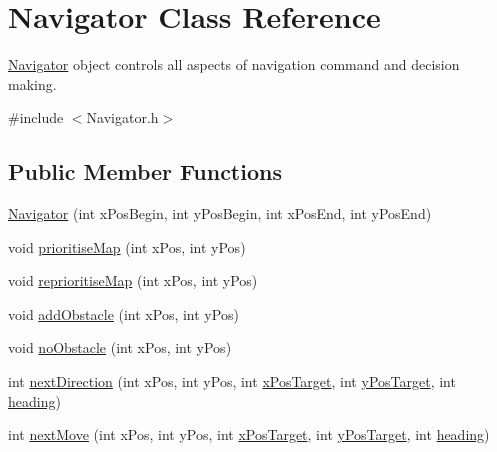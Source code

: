 \hypertarget{class_navigator}{}\section{Navigator Class Reference}
\label{class_navigator}


\mbox{\hyperlink{class_navigator}{Navigator}} object controls all aspects of navigation command and decision making.  




{\ttfamily \#include $<$Navigator.\+h$>$}

\subsection*{Public Member Functions}
\begin{DoxyCompactItemize}
\item 
\mbox{\hyperlink{class_navigator_a5399182d9269dbfb04c2714c6b2dc755}{Navigator}} (int x\+Pos\+Begin, int y\+Pos\+Begin, int x\+Pos\+End, int y\+Pos\+End)
\item 
void \mbox{\hyperlink{class_navigator_a8e5fe25410be1caacb0178e72cea97d5}{prioritise\+Map}} (int x\+Pos, int y\+Pos)
\item 
void \mbox{\hyperlink{class_navigator_a5c53232cd85ce551986bd668625de005}{reprioritise\+Map}} (int x\+Pos, int y\+Pos)
\item 
void \mbox{\hyperlink{class_navigator_af5a35f0ae71309c1b276257709b24390}{add\+Obstacle}} (int x\+Pos, int y\+Pos)
\item 
void \mbox{\hyperlink{class_navigator_a65783f6fb9884159a5365a5083f11a2e}{no\+Obstacle}} (int x\+Pos, int y\+Pos)
\item 
int \mbox{\hyperlink{class_navigator_afd635da3acecec77272cbbeccfc29b35}{next\+Direction}} (int x\+Pos, int y\+Pos, int \mbox{\hyperlink{bot_main_8ino_a9ff06ce163dbdadcbad347cd3f4fd6b1}{x\+Pos\+Target}}, int \mbox{\hyperlink{bot_main_8ino_a4c0ad4a6d9cc090aaf844632d913b377}{y\+Pos\+Target}}, int \mbox{\hyperlink{bot_main_8ino_aa0a9c2882aad6535e52a6d429f1d42da}{heading}})
\item 
int \mbox{\hyperlink{class_navigator_adc3bf5b4eaefc643922e612a77a07ff1}{next\+Move}} (int x\+Pos, int y\+Pos, int \mbox{\hyperlink{bot_main_8ino_a9ff06ce163dbdadcbad347cd3f4fd6b1}{x\+Pos\+Target}}, int \mbox{\hyperlink{bot_main_8ino_a4c0ad4a6d9cc090aaf844632d913b377}{y\+Pos\+Target}}, int \mbox{\hyperlink{bot_main_8ino_aa0a9c2882aad6535e52a6d429f1d42da}{heading}})
\item 

\end{DoxyCompactItemize}
